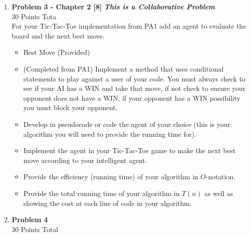 \documentclass{article}
\begin{document}
\begin{enumerate}
    \vspace{5mm}

    \item \textbf{Problem 3 - Chapter 2 [8]} \textbf{\emph{This is a Collaborative Problem}}\\
    30 Points Tota\\

	For your Tic-Tac-Toe implementation from PA1 add an agent to evaluate the board and the next best move.
	
	\begin{itemize}
		\item Best Move (Provided)
		\item (Completed from PA1) Implement a method that uses conditional statements to play against a user of your code. You must always check to see if your AI has a WIN and take that move, if not check to ensure your opponent does not have a WIN, if your opponent has a WIN possibility you must block your opponent. 
		\item Develop in pseudocode or code the agent of your choice (this is your algorithm you will need to provide the running time for).
		\item Implement the agent in your Tic-Tac-Toe game to make the next best move according to your intelligent agent.
		\item Provide the efficiency (running time) of your algorithm in $O$-notation.
		\item Provide the total running time of your algorithm in $T(n)$ as well as showing the cost at each line of code in your algorithm. 
	\end{itemize}

    \vspace{5mm}

    \item \textbf{Problem 4 } \\
    30 Points Total\\
    

\end{enumerate}
\end{document}
